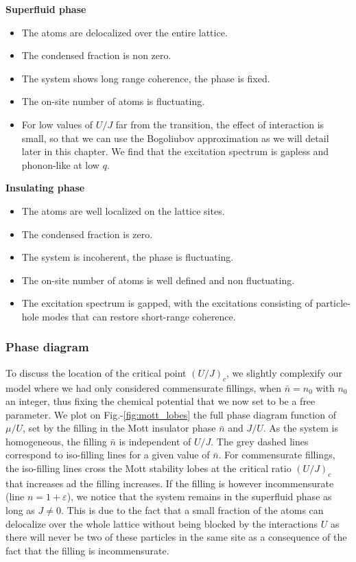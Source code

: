 \begin{minipage}[t]{0.45\textwidth}
    \noindent \textbf{Superfluid phase}
    \begin{itemize}
        \item The atoms are delocalized over the entire lattice.
        \item The condensed fraction is non zero.
        \item The system shows long range coherence, \ie the phase is fixed.
        \item The on-site number of atoms is fluctuating.
        \item For low values of $U/J$ far from the transition, the effect of interaction is small, so that we can use the Bogoliubov approximation as we will detail later in this chapter. We find that the excitation spectrum is gapless and phonon-like at low $q$.
    \end{itemize}
\end{minipage}
\begin{minipage}[t]{0.48\textwidth}
    \noindent \textbf{Insulating phase}
    \begin{itemize}
        \item The atoms are well localized on the lattice sites.
        \item The condensed fraction is zero.
        \item The system is incoherent, the phase is fluctuating.
        \item The on-site number of atoms is well defined and non fluctuating.
        \item The excitation spectrum is gapped, with the excitations consisting of particle-hole modes that can restore short-range coherence. 
    \end{itemize}
\end{minipage}

\subsubsection{Phase diagram}

 To discuss the location of the critical point $(U/J)_c$, we slightly complexify our model where we had only considered commensurate fillings, \ie when $\bar{n}=n_0$ with $n_0$ an integer, thus fixing the chemical potential that we now set to be a free parameter. We plot on Fig.-\ref{fig:mott_lobes} the full phase diagram function of $\mu/U$, set by the filling in the Mott insulator phase $\bar{n}$ and $J/U$. As the system is homogeneous, the filling $\bar{n}$ is independent of $U/J$. The grey dashed lines correspond to iso-filling lines for a given value of $\bar{n}$. For commensurate fillings, the iso-filling lines cross the Mott stability lobes at the critical ratio $(U/J)_c$ that increases ad the filling increases. If the filling is however incommensurate (line $n=1+\varepsilon$), we notice that the system remains in the superfluid phase as long as $J \neq 0$. This is due to the fact that a small fraction of the atoms can delocalize over the whole lattice without being blocked by the interactions $U$ as there will never be two of these particles in the same site as a consequence of the fact that the filling is incommensurate.

